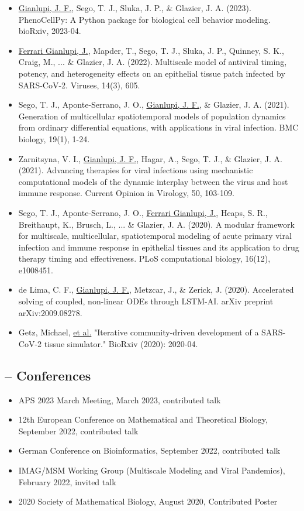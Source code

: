 \begin{itemize}\setlength\itemsep{-0.9em}
    \item \underline{Gianlupi, J. F.}, Sego, T. J., Sluka, J. P., \& Glazier, J. A. (2023). PhenoCellPy: A Python package for biological cell behavior modeling. bioRxiv, 2023-04.
    \item \underline{Ferrari Gianlupi, J.}, Mapder, T., Sego, T. J., Sluka, J. P., Quinney, S. K., Craig, M., ... \& Glazier, J. A. (2022). Multiscale model of antiviral timing, potency, and heterogeneity effects on an epithelial tissue patch infected by SARS-CoV-2. Viruses, 14(3), 605.
    \item Sego, T. J., Aponte-Serrano, J. O., \underline{Gianlupi, J. F.}, \& Glazier, J. A. (2021). Generation of multicellular spatiotemporal models of population dynamics from ordinary differential equations, with applications in viral infection. BMC biology, 19(1), 1-24.
    \item Zarnitsyna, V. I., \underline{Gianlupi, J. F.}, Hagar, A., Sego, T. J., \& Glazier, J. A. (2021). Advancing therapies for viral infections using mechanistic computational models of the dynamic interplay between the virus and host immune response. Current Opinion in Virology, 50, 103-109.
    \item Sego, T. J., Aponte-Serrano, J. O., \underline{Ferrari Gianlupi, J.}, Heaps, S. R., Breithaupt, K., Brusch, L., ... \& Glazier, J. A. (2020). A modular framework for multiscale, multicellular, spatiotemporal modeling of acute primary viral infection and immune response in epithelial tissues and its application to drug therapy timing and effectiveness. PLoS computational biology, 16(12), e1008451.
    \item de Lima, C. F., \underline{Gianlupi, J. F.}, Metzcar, J., \& Zerick, J. (2020). Accelerated solving of coupled, non-linear ODEs through LSTM-AI. arXiv preprint arXiv:2009.08278.
    \item Getz, Michael, \underline{et al.} "Iterative community-driven development of a SARS-CoV-2 tissue simulator." BioRxiv (2020): 2020-04.
\end{itemize}

\subsection*{-- Conferences}
\begin{itemize}\setlength\itemsep{-0.9em}
    \item APS 2023 March Meeting, March 2023, contributed talk
    \item 12th European Conference on Mathematical and Theoretical Biology, September 2022, contributed  talk
    \item German Conference on Bioinformatics, September 2022, contributed  talk
    \item IMAG/MSM Working Group (Multiscale Modeling and Viral Pandemics), February 2022, invited talk
    \item 2020 Society of Mathematical Biology, August 2020, Contributed Poster
\end{itemize}


